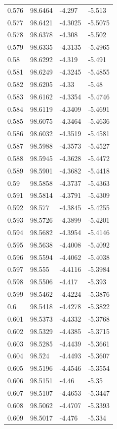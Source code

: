 \begin{tabular}{llll}
0.576 & 98.6464 & -4.297 & -5.513 \\
0.577 & 98.6421 & -4.3025 & -5.5075 \\
0.578 & 98.6378 & -4.308 & -5.502 \\
0.579 & 98.6335 & -4.3135 & -5.4965 \\
0.58 & 98.6292 & -4.319 & -5.491 \\
0.581 & 98.6249 & -4.3245 & -5.4855 \\
0.582 & 98.6205 & -4.33 & -5.48 \\
0.583 & 98.6162 & -4.3354 & -5.4746 \\
0.584 & 98.6119 & -4.3409 & -5.4691 \\
0.585 & 98.6075 & -4.3464 & -5.4636 \\
0.586 & 98.6032 & -4.3519 & -5.4581 \\
0.587 & 98.5988 & -4.3573 & -5.4527 \\
0.588 & 98.5945 & -4.3628 & -5.4472 \\
0.589 & 98.5901 & -4.3682 & -5.4418 \\
0.59 & 98.5858 & -4.3737 & -5.4363 \\
0.591 & 98.5814 & -4.3791 & -5.4309 \\
0.592 & 98.577 & -4.3845 & -5.4255 \\
0.593 & 98.5726 & -4.3899 & -5.4201 \\
0.594 & 98.5682 & -4.3954 & -5.4146 \\
0.595 & 98.5638 & -4.4008 & -5.4092 \\
0.596 & 98.5594 & -4.4062 & -5.4038 \\
0.597 & 98.555 & -4.4116 & -5.3984 \\
0.598 & 98.5506 & -4.417 & -5.393 \\
0.599 & 98.5462 & -4.4224 & -5.3876 \\
0.6 & 98.5418 & -4.4278 & -5.3822 \\
0.601 & 98.5373 & -4.4332 & -5.3768 \\
0.602 & 98.5329 & -4.4385 & -5.3715 \\
0.603 & 98.5285 & -4.4439 & -5.3661 \\
0.604 & 98.524 & -4.4493 & -5.3607 \\
0.605 & 98.5196 & -4.4546 & -5.3554 \\
0.606 & 98.5151 & -4.46 & -5.35 \\
0.607 & 98.5107 & -4.4653 & -5.3447 \\
0.608 & 98.5062 & -4.4707 & -5.3393 \\
0.609 & 98.5017 & -4.476 & -5.334 \\

\end{tabular}
